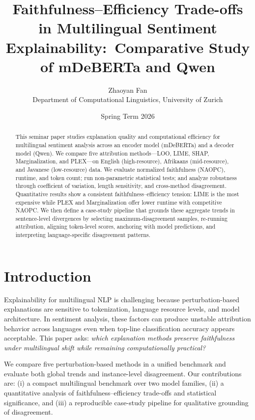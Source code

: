 \documentclass[11pt]{article}
\title{Faithfulness--Efficiency Trade-offs in Multilingual Sentiment Explainability:\ Comparative Study of mDeBERTa and Qwen}
\author{Zhaoyan Fan \\
Department of Computational Linguistics, University of Zurich}
\date{Spring Term 2026}
\begin{document}
\maketitle

\begin{abstract}
This seminar paper studies explanation quality and computational efficiency for multilingual sentiment analysis across an encoder model (mDeBERTa) and a decoder model (Qwen). We compare five attribution methods---LOO, LIME, SHAP, Marginalization, and PLEX---on English (high-resource), Afrikaans (mid-resource), and Javanese (low-resource) data. We evaluate normalized faithfulness (NAOPC), runtime, and token count; run non-parametric statistical tests; and analyze robustness through coefficient of variation, length sensitivity, and cross-method disagreement. Quantitative results show a consistent faithfulness--efficiency tension: LIME is the most expensive while PLEX and Marginalization offer lower runtime with competitive NAOPC. We then define a case-study pipeline that grounds these aggregate trends in sentence-level divergences by selecting maximum-disagreement samples, re-running attribution, aligning token-level scores, anchoring with model predictions, and interpreting language-specific disagreement patterns.
\end{abstract}

\section{Introduction}
Explainability for multilingual NLP is challenging because perturbation-based explanations are sensitive to tokenization, language resource levels, and model architecture. In sentiment analysis, these factors can produce unstable attribution behavior across languages even when top-line classification accuracy appears acceptable. This paper asks: \textit{which explanation methods preserve faithfulness under multilingual shift while remaining computationally practical?}

We compare five perturbation-based methods in a unified benchmark and evaluate both global trends and instance-level disagreement. Our contributions are: (i) a compact multilingual benchmark over two model families, (ii) a quantitative analysis of faithfulness--efficiency trade-offs and statistical significance, and (iii) a reproducible case-study pipeline for qualitative grounding of disagreement.
\end{document}
